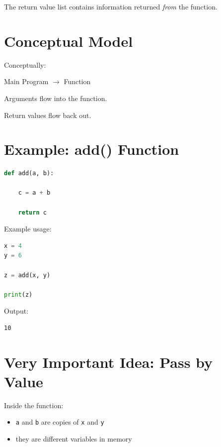 \documentclass[11pt]{article}
\begin{document}
The return value list contains information returned \emph{from} the function.

\section{Conceptual Model}

Conceptually:

\begin{center}
Main Program $\rightarrow$ Function

\vspace{0.3cm}

Arguments flow into the function.

\vspace{0.3cm}

Return values flow back out.
\end{center}

\section{Example: add() Function}

\begin{lstlisting}[language=Python]
def add(a, b):

    c = a + b

    return c
\end{lstlisting}

Example usage:

\begin{lstlisting}[language=Python]
x = 4
y = 6

z = add(x, y)

print(z)
\end{lstlisting}

Output:

\begin{lstlisting}
10
\end{lstlisting}

\section{Very Important Idea: Pass by Value}

Inside the function:

\begin{itemize}
    \item \texttt{a} and \texttt{b} are copies of \texttt{x} and \texttt{y}
    \item they are different variables in memory
\end{itemize}
\end{document}
